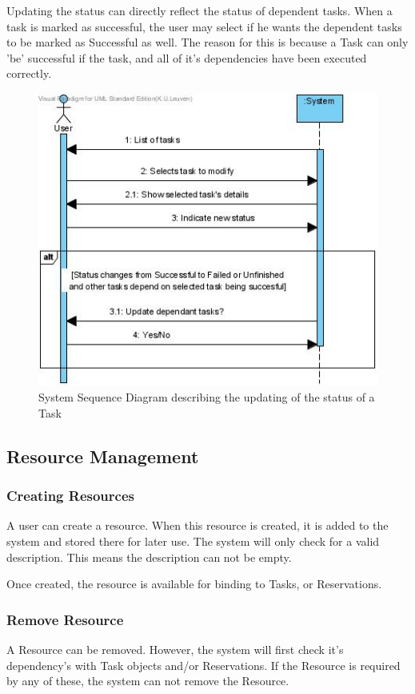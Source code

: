 			Updating the status can directly reflect the status of dependent tasks. When a task is marked as successful, the user may select if he wants the dependent tasks to be marked as Successful as well.
			The reason for this is because a Task can only 'be' successful if the task, and all of it's dependencies have been executed correctly.
			\begin{figure}[h!]
				\begin{center}
					\includegraphics[scale=0.5]{images/ssd_update_task.jpg}
				\end{center}
				\caption{System Sequence Diagram describing the updating of the status of a Task}
			\end{figure}
		\subsection{Resource Management}
			\subsubsection{Creating Resources}
			A user can create a resource. When this resource is created, it is added to the system and stored there for later use.
			The system will only check for a valid description. This means the description can not be empty.

			Once created, the resource is available for binding to Tasks, or Reservations.
			\subsubsection{Remove Resource}
			A Resource can be removed. However, the system will first check it's dependency's with Task objects and/or Reservations.
			If the Resource is required by any of these, the system can not remove the Resource.
